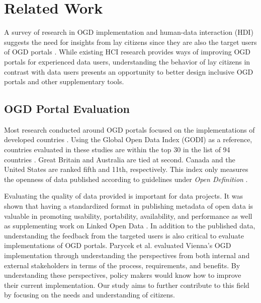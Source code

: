 \documentclass{sigchi}
\begin{document}
\section{Related Work}
A survey of research in OGD implementation and human-data interaction (HDI) suggests the need for insights from lay citizens since they are also the target users of OGD portals \cite{warwick2017}. While existing HCI research provides ways of improving OGD portals for experienced data users, understanding the behavior of lay citizens in contrast with data users presents an opportunity to better design inclusive OGD portals and other supplementary tools. 

\subsection{OGD Portal Evaluation}
Most research conducted around OGD portals focused on the implementations of developed countries \cite{kacprzak2019characterising, klimek2019dcat, Koesten2019,Parycek2014}. Using the Global Open Data Index (GODI) as a reference, countries evaluated in these studies are within the top 30 in the list of 94 countries \cite{godimetric2016}. Great Britain and Australia are tied at second. Canada and the United States are ranked fifth and 11th, respectively. This index only measures the openness of data published according to guidelines under \textit{Open Definition} \cite{godimetric2016}. 

Evaluating the quality of data provided is important for data projects. It was shown that having a standardized format in publishing metadata of open data is valuable in promoting usability, portability, availability, and performance as well as supplementing work on Linked Open Data \cite{klimek2019dcat}. In addition to the published data, understanding the feedback from the targeted users is also critical to evaluate implementations of OGD portals. Parycek et al. \cite{Parycek2014} evaluated Vienna's OGD implementation through understanding the perspectives from both internal and external stakeholders in terms of the process, requirements, and benefits. By understanding these perspectives, policy makers would know how to improve their current implementation. Our study aims to further contribute to this field by focusing on the needs and understanding of citizens.
\end{document}
